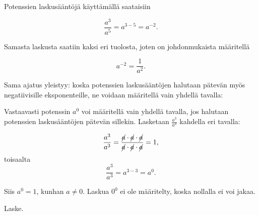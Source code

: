 Potenssien laskusääntöjä käyttämällä saataisiin
    
    \begin{equation*}
        \frac{a^3}{a^5} = a^{3-5}= a^{-2}{.}
    \end{equation*}
    
Samasta laskusta saatiin kaksi eri tuolosta, joten on johdonmukaista
määritellä
    
    \begin{equation*}
        a^{-2} = \frac{1}{a^2}.
    \end{equation*}

Sama ajatus yleistyy: koska potenssien laskusääntöjen halutaan pätevän myös negatiivisille
eksponenteille, ne voidaan määritellä vain yhdellä tavalla:
  
    
Vastaavasti potenssin $a^0$ voi määritellä vain yhdellä tavalla, jos halutaan
potenssien laskusääntöjen pätevän sillekin. Lasketaan $\frac{a^3}{a^3}$
kahdella eri tavalla:

    \[
        \frac{a^3}{a^3}=\frac{\cancel{a}\cdot \cancel{a}\cdot \cancel{a}}
        {\cancel{a}\cdot \cancel{a}\cdot \cancel{a}}=1,
    \]
	toisaalta
 \[ \frac{a^3}{a^3}=a^{3-3}=a^0. \]

Siis $a^0=1$, kunhan $a\neq 0$.  Laskua $0^0$ ei ole määritelty, koska
nollalla ei voi jakaa. 
 
  

    \begin{esimerkki}
        Laske.
        \begin{alakohdat}
         \end{alakohdat}
    \end{esimerkki}  



